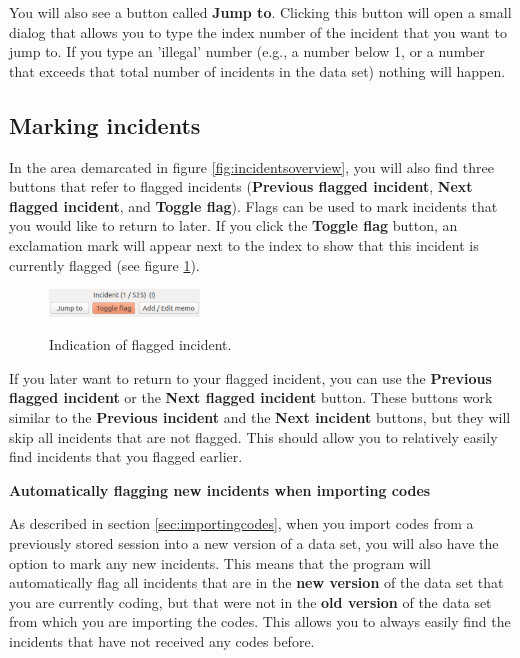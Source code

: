 \documentclass{memoir}
\begin{document}
You will also see a button called \textbf{Jump to}. Clicking this button will open a small dialog that allows you to type the index number of the incident that you want to jump to. If you type an 'illegal' number (e.g., a number below 1, or a number that exceeds that total number of incidents in the data set) nothing will happen. 

\subsection{Marking incidents}
\label{sec:markingincidents}

In the area demarcated in figure \ref{fig:incidentsoverview}, you will also find three buttons that refer to flagged incidents (\textbf{Previous flagged incident}, \textbf{Next flagged incident}, and \textbf{Toggle flag}). Flags can be used to mark incidents that you would like to return to later. If you click the \textbf{Toggle flag} button, an exclamation mark will appear next to the index to show that this incident is currently flagged (see figure \ref{fig:flaggedincident}).

\begin{figure}[h!]
  \centering
  \caption{Indication of flagged incident.}
  \includegraphics[width=40mm]{Screenshot_5.pdf}
  \label{fig:flaggedincident}
\end{figure}

If you later want to return to your flagged incident, you can use the \textbf{Previous flagged incident} or the \textbf{Next flagged incident} button. These buttons work similar to the \textbf{Previous incident} and the \textbf{Next incident} buttons, but they will skip all incidents that are not flagged. This should allow you to relatively easily find incidents that you flagged earlier.

\begin{framed}
\textbf{Automatically flagging new incidents when importing codes}
  
  As described in section \ref{sec:importingcodes}, when you import codes from a previously stored session into a new version of a data set, you will also have the option to mark any new incidents. This means that the program will automatically flag all incidents that are in the \textbf{new version} of the data set that you are currently coding, but that were not in the \textbf{old version} of the data set from which you are importing the codes. This allows you to always easily find the incidents that have not received any codes before. 
\end{framed}
\end{document}
